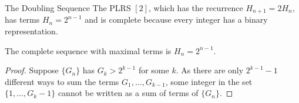 \documentclass{beamer}
\begin{document}
\begin{frame}{
    The Doubling Sequence}
    The PLRS $[2]$, which has the recurrence $H_{n+1} = 2H_n$, has terms $H_n = 2^{n - 1}$ and is complete because every integer has a binary representation.
    \pause
    \bigskip
    \begin{theorem}[Brown]
    The complete sequence with maximal terms is $H_n= 2^{n-1}$.
    \end{theorem}
    \pause
    \begin{proof}
	    Suppose $\{ G_{n} \}$ has $G_{k}>2^{k-1}$ for some $k$. As there are only $2^{k-1}-1$ different ways to sum the terms $G_1,\ldots , G_{k-1}$, some integer in the set $\{ 1,\ldots , G_{k}-1 \}$ cannot be written as a sum of terms of $\{G_n\}$.
    \end{proof}
   \end{frame}
    
    
\end{document}
